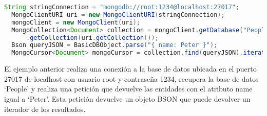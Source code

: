 \begin{lstlisting}[language=java]
  String stringConnection = "mongodb://root:1234@localhost:27017";
  MongoClientURI uri = new MongoClientURI(stringConnection);
  mongoClient = new MongoClient(uri);
  MongoCollection<Document> collection = mongoClient.getDatabase("People")
      .getCollection(uri.getCollection());
  Bson queryJSON = BasicDBObject.parse("{ name: Peter }");
  MongoCursor<Document> mongoCursor = collection.find(queryJSON).iterator();
\end{lstlisting}

El ejemplo anterior realiza una conexión a la base de datos ubicada en el puerto 27017 de localhost con usuario root y contraseña 1234, recupera la base de datos `People' y realiza una petición que devuelve las entidades con el atributo name igual a `Peter'. Esta petición devuelve un objeto BSON que puede devolver un iterador de los resultados.

